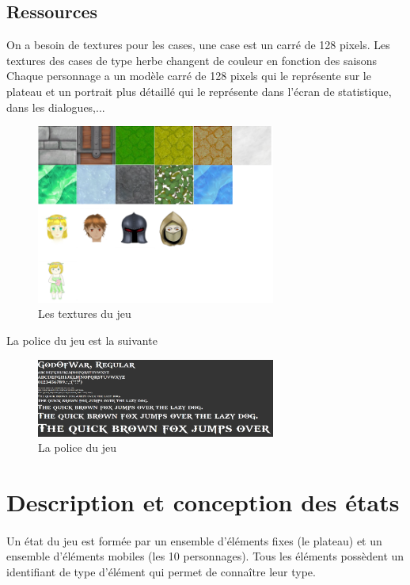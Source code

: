 \documentclass[a4paper,12pt]{article}
\begin{document}
\subsection{Ressources}
On a besoin de textures pour les cases, une case est un carré de 128 pixels. Les textures des cases de type herbe changent de couleur en fonction des saisons
Chaque personnage a un modèle carré de 128 pixels qui le représente sur le plateau et un portrait plus détaillé qui le représente dans l'écran de statistique, dans les dialogues,...
\begin{figure}[ht]
\begin{center}
\includegraphics[width=0.7\textwidth]{textures.png}
\caption{\label{pacmangame}Les textures du jeu}
\end{center}
\end{figure}
\newpage
La police du jeu est la suivante 
\begin{figure}[ht]
\begin{center}
\includegraphics[width=0.7\textwidth]{ressource_police.png}
\caption{\label{pacmangame}La police du jeu}
\end{center}
\end{figure}
\clearpage
\section{Description et conception des états}
\paragraph{} Un état du jeu est formée par un ensemble d’éléments fixes (le plateau) et un ensemble d’éléments mobiles (les 10 personnages). Tous les éléments possèdent un identifiant de type d'élément qui permet de connaître leur type.
\end{document}
